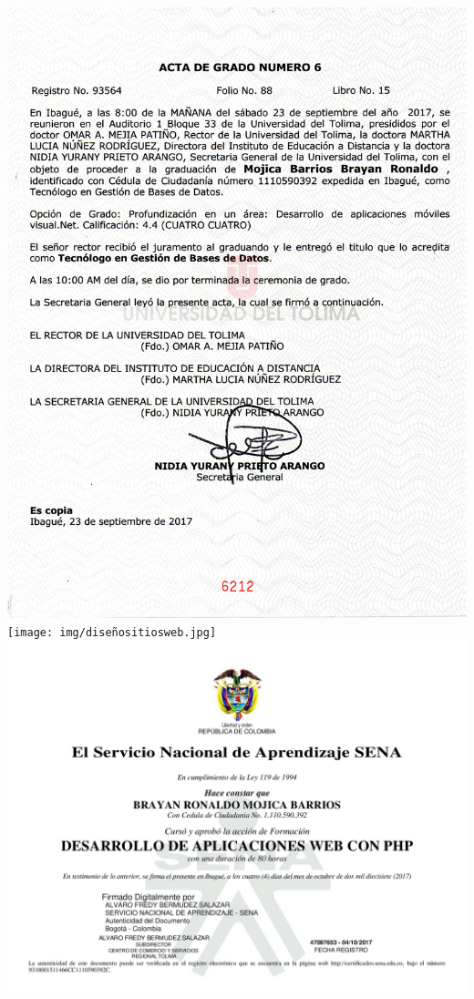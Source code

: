 \documentclass[letterpaper]{twentysecondcv} %
\begin{document}
\includegraphics[width=\textwidth]{img/actadegradotecnologo.jpg} 
\newpage
\makesidebarcommon
\texttt{[image: img/diseñositiosweb.jpg]} 
\includegraphics[width=\textwidth]{img/laravel.jpg}
\end{document}
